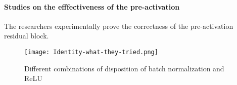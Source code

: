 \paragraph{Studies on the efffectiveness of the pre-activation}
The researchers experimentally prove the correctness of the pre-activation residual block.
\begin{figure}[H]
    \centering
    \texttt{[image: Identity-what-they-tried.png]}
    \caption{Different combinations of disposition of batch normalization and ReLU}
\end{figure}